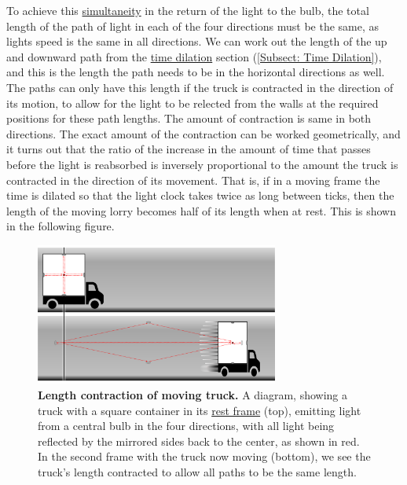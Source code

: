 To achieve this \hyperlink{def-simultaneity}{simultaneity} in the return of the light to the bulb, the total length of the path of light in each of the four directions must be the same, as lights speed is the same in all directions.
We can work out the length of the up and downward path from the \hyperlink{def-time-dilation}{time dilation} section (\ref{Subsect: Time Dilation}), and this is the length the path needs to be in the horizontal directions as well.
The paths can only have this length if the truck is contracted in the direction of its motion, to allow for the light to be relected from the walls at the required positions for these path lengths.
The amount of contraction is same in both directions.
The exact amount of the contraction can be worked geometrically, and it turns out that the ratio of the increase in the amount of time that passes before the light is reabsorbed is inversely proportional to the amount the truck is contracted in the direction of its movement.
That is, if in a moving frame the time is dilated so that the light clock takes twice as long between ticks, then the length of the moving lorry becomes half of its length when at rest.
This is shown in the following figure.

\begin{figure}[H]
	\centering
	\includegraphics[width = 8cm]{images/pdf/Full_Lorry_Transform.pdf}
	\caption{\textbf{Length contraction of moving truck.} A diagram, showing a truck with a square container in its \protect\hyperlink{def-proper-frame}{rest frame} (top), emitting light from a central bulb in the four directions, with all light being reflected by the mirrored sides back to the center, as shown in red. In the second frame with the truck now moving (bottom), we see the truck's length contracted to allow all paths to be the same length.}
	\label{fig: full truck transform}
\end{figure}

%

